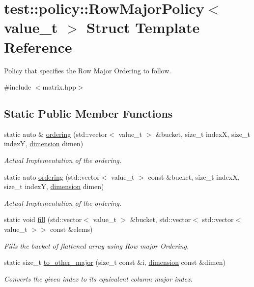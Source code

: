 \hypertarget{structtest_1_1policy_1_1RowMajorPolicy}{}\section{test\+::policy\+::Row\+Major\+Policy$<$ value\+\_\+t $>$ Struct Template Reference}
\label{structtest_1_1policy_1_1RowMajorPolicy}


Policy that specifies the Row Major Ordering to follow.  




{\ttfamily \#include $<$matrix.\+hpp$>$}

\subsection*{Static Public Member Functions}
\begin{DoxyCompactItemize}
\item 
static auto \& \mbox{\hyperlink{structtest_1_1policy_1_1RowMajorPolicy_a862f972e1da945460b24af90cf5533e5}{ordering}} (std\+::vector$<$ value\+\_\+t $>$ \&bucket, size\+\_\+t indexX, size\+\_\+t indexY, \mbox{\hyperlink{structtest_1_1dimension}{dimension}} dimen)
\begin{DoxyCompactList}\small\item\em Actual Implementation of the ordering. \end{DoxyCompactList}\item 
static auto \mbox{\hyperlink{structtest_1_1policy_1_1RowMajorPolicy_a48c1fe308e4c58bcde82ef8312248087}{ordering}} (std\+::vector$<$ value\+\_\+t $>$ const \&bucket, size\+\_\+t indexX, size\+\_\+t indexY, \mbox{\hyperlink{structtest_1_1dimension}{dimension}} dimen)
\begin{DoxyCompactList}\small\item\em Actual Implementation of the ordering. \end{DoxyCompactList}\item 
static void \mbox{\hyperlink{structtest_1_1policy_1_1RowMajorPolicy_a68968039746ed1ba42d2931785290d21}{fill}} (std\+::vector$<$ value\+\_\+t $>$ \&bucket, std\+::vector$<$ std\+::vector$<$ value\+\_\+t $>$$>$ const \&elems)
\begin{DoxyCompactList}\small\item\em Fills the bucket of flattened array using Row major Ordering. \end{DoxyCompactList}\item 
static size\+\_\+t \mbox{\hyperlink{structtest_1_1policy_1_1RowMajorPolicy_a1718589ddd0aed57c9b7ffbd77cb4682}{to\+\_\+other\+\_\+major}} (size\+\_\+t const \&i, \mbox{\hyperlink{structtest_1_1dimension}{dimension}} const \&dimen)
\begin{DoxyCompactList}\small\item\em Converts the given index to its equivalent column major index. \end{DoxyCompactList}\end{DoxyCompactItemize}


